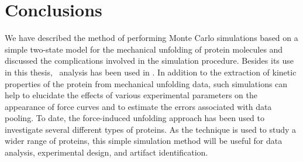 \section{Conclusions}
\label{sec:sawsim:conclusions}

We have described the method of performing Monte Carlo simulations
based on a simple two-state model for the mechanical unfolding of
protein molecules and discussed the complications involved in the
simulation procedure.  Besides its use in this thesis,
\sawsim\ analysis has been used in .  In
addition to the extraction of kinetic properties of the protein from
mechanical unfolding data, such simulations can help to elucidate the
effects of various experimental parameters on the appearance of force
curves and to estimate the errors associated with data pooling.  To
date, the force-induced unfolding approach has been used to
investigate several different types of proteins.  As the technique is
used to study a wider range of proteins, this simple simulation method
will be useful for data analysis, experimental design, and artifact
identification.
